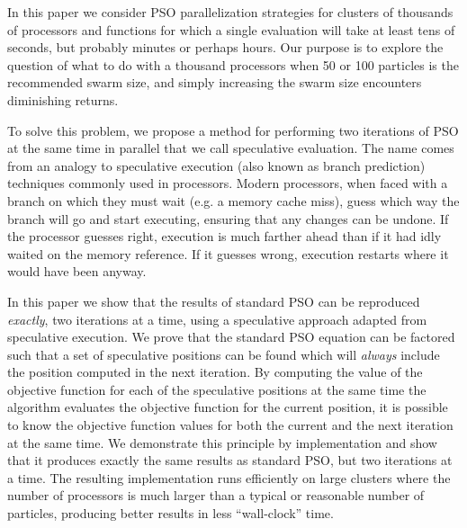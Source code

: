 \documentclass[journal,letterpaper]{IEEEtran}
\begin{document}
In this paper we consider PSO parallelization strategies for clusters of
thousands of processors and functions for which a single evaluation will take
at least tens of seconds, but probably minutes or perhaps hours.  Our purpose
is to explore the question of what to do with a thousand processors when 50 or
100 particles is the recommended swarm size, and simply increasing the swarm
size encounters diminishing returns.

To solve this problem, we propose a method for performing two iterations of PSO
at the same time in parallel that we call speculative evaluation.  The name
comes from an analogy to speculative execution (also known as branch
prediction) techniques commonly used in processors.  Modern processors, when
faced with a branch on which they must wait (e.g. a memory cache miss), guess
which way the branch will go and start executing, ensuring that any changes
can be undone.  If the processor guesses right, execution is
much farther ahead than if it had idly waited on the memory reference.  If
it guesses wrong, execution restarts where it would have been anyway.  

In this paper we show that the results of standard PSO can be reproduced
\emph{exactly}, two iterations at a time, using a speculative approach adapted
from speculative execution. We prove that the standard PSO equation can be
factored such that a set of speculative positions can be found which will
\emph{always} include the position computed in the next iteration.  By
computing the value of the objective function for each of the speculative
positions at the same time the algorithm evaluates the objective function for
the current position, it is possible to know the objective function values for
both the current and the next iteration at the same time.  We demonstrate this
principle by implementation and show that it produces exactly the same results
as standard PSO, but two iterations at a time.  The resulting implementation
runs efficiently on large clusters where the number of processors is much
larger than a typical or reasonable number of particles, producing better
results in less ``wall-clock'' time.
\end{document}
